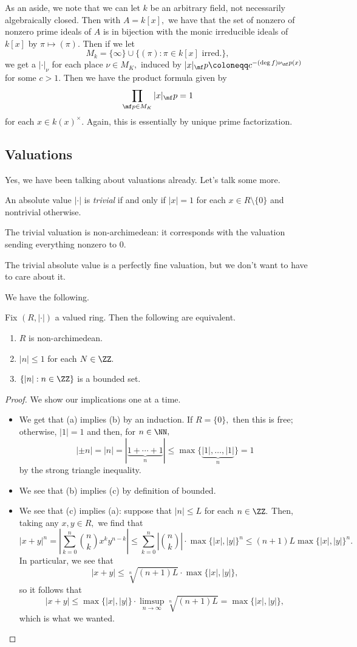 \documentclass[../notes.tex]{subfiles}
\begin{document}
As an aside, we note that we can let $k$ be an arbitrary field, not necessarily algebraically closed. Then with $A=k[x],$ we have that the set of nonzero of nonzero prime ideals of $A$ is in bijection with the monic irreducible ideals of $k[x]$ by $\pi\mapsto(\pi).$ Then if we let
\[M_k=\{\infty\}\cup\{(\pi):\pi\in k[x]\text{ irred.}\},\]
we get a $|\cdot|_\nu$ for each place $\nu\in M_K,$ induced by $|x|_\mf p\coloneqq c^{-(\deg f)\nu_\mf p(x)}$ for some $c>1.$ Then we have the product formula given by
\[\prod_{\mf p\in M_K}|x|_\mf p=1\]
for each $x\in k(x)^\times.$ Again, this is essentially by unique prime factorization.

\subsection{Valuations}
Yes, we have been talking about valuations already. Let's talk some more.
\begin{definition}[Trivial]
	An absolute value $|\cdot|$ is \textit{trivial} if and only if $|x|=1$ for each $x\in R\setminus\{0\}$ and nontrivial otherwise.
\end{definition}
\begin{remark}
	The trivial valuation is non-archimedean: it corresponds with the valuation sending everything nonzero to $0.$
\end{remark}
The trivial absolute value is a perfectly fine valuation, but we don't want to have to care about it.

We have the following.
\begin{proposition}
	Fix $(R,|\cdot|)$ a valued ring. Then the following are equivalent.
	\begin{enumerate}[label=(\alph*)]
		\item $R$ is non-archimedean.
		\item $|n|\le1$ for each $N\in\ZZ.$
		\item $\{|n|:n\in\ZZ\}$ is a bounded set.
	\end{enumerate}
\end{proposition}
\begin{proof}
	We show our implications one at a time.
	\begin{itemize}
		\item We get that (a) implies (b) by an induction. If $R=\{0\},$ then this is free; otherwise, $|1|=1$ and then, for $n\in\NN,$
		\[|\pm n|=|n|=|\underbrace{1+\cdots+1}_n|\le\max\{\underbrace{|1|,\ldots,|1|}_n\}=1\]
		by the strong triangle inequality.
		\item We see that (b) implies (c) by definition of bounded.
		\item We see that (c) implies (a): suppose that $|n|\le L$ for each $n\in\ZZ.$ Then, taking any $x,y\in R,$ we find that
		\[|x+y|^n=\left|\sum_{k=0}^n\binom nkx^ky^{n-k}\right|\le\sum_{k=0}^n\left|\binom nk\right|\cdot\max\{|x|,|y|\}^n\le(n+1)L\max\{|x|,|y|\}^n.\]
		In particular, we see that
		\[|x+y|\le\sqrt[n]{(n+1)L}\cdot\max\{|x|,|y|\},\]
		so it follows that
		\[|x+y|\le\max\{|x|,|y|\}\cdot\limsup_{n\to\infty}\sqrt[n]{(n+1)L}=\max\{|x|,|y|\},\]
		which is what we wanted.
		\qedhere
	\end{itemize}
\end{proof}
\end{document}
